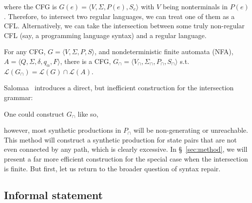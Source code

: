 \documentclass[sigplan,acmsmall,nonacm,screen]{acmart}\settopmatter{printfolios=false,printccs=false,printacmref=false}
\begin{document}
\noindent where the CFG is $G(e) = \langle V, \Sigma, P(e), S_e\rangle$ with $V$ being nonterminals in $P(e)$. Therefore, to intersect two regular languages, we can treat one of them as a CFL. Alternatively, we can take the intersection between some truly non-regular CFL (say, a programming language syntax) and a regular language.

\begin{theorem}
  For any CFG, $G = \langle V, \Sigma, P, S\rangle$, and nondeterministic finite automata (NFA), $A = \langle Q, \Sigma, \delta, q_\alpha, F\rangle$, there is a CFG, \(G_\cap=\langle V_\cap, \Sigma_\cap, P_\cap, S_\cap\rangle\) s.t. $\mathcal{L}(G_\cap) = \mathcal{L}(G)\cap\mathcal{L}(A)$.
\end{theorem}

\noindent Salomaa~\cite{salomaa1973formal} introduces a direct, but inefficient construction for the intersection grammar:

\begin{definition}[Salomaa, 1973]
  One could construct $G_\cap$ like so,

  \noindent{}
\end{definition}\vspace{0.2cm}

\noindent however, most synthetic productions in $P_\cap$ will be non-generating or unreachable. This method will construct a synthetic production for state pairs that are not even connected by any path, which is clearly excessive. In \S~\ref{sec:method}, we will present a far more efficient construction for the special case when the intersection is finite. But first, let us return to the broader question of syntax repair.

\subsection{Informal statement}
\end{document}
